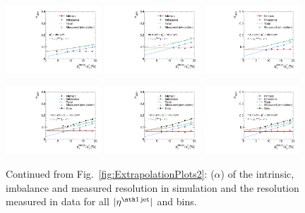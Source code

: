\begin{figure}[!h]
    \includegraphics[width=0.32\textwidth]{figures/resolution/results/JER_for_3_eta_bin_12_pTGamma_bin_all_contributions_PFCHS_RMS99_mc.pdf}
    \includegraphics[width=0.32\textwidth]{figures/resolution/results/JER_for_4_eta_bin_4_pTGamma_bin_all_contributions_PFCHS_RMS99_mc.pdf}
    \includegraphics[width=0.32\textwidth]{figures/resolution/results/JER_for_4_eta_bin_5_pTGamma_bin_all_contributions_PFCHS_RMS99_mc.pdf}

    \includegraphics[width=0.32\textwidth]{figures/resolution/results/JER_for_4_eta_bin_6_pTGamma_bin_all_contributions_PFCHS_RMS99_mc.pdf}
    \includegraphics[width=0.32\textwidth]{figures/resolution/results/JER_for_4_eta_bin_7_pTGamma_bin_all_contributions_PFCHS_RMS99_mc.pdf}
    \includegraphics[width=0.32\textwidth]{figures/resolution/results/JER_for_4_eta_bin_8_pTGamma_bin_all_contributions_PFCHS_RMS99_mc.pdf}
  \caption{Continued from Fig.~\ref{fig:ExtrapolationPlots2}: \jer($\alpha$) of the intrinsic, imbalance and measured resolution in simulation and the resolution measured in data for all $|\etafirstjet|$ and \ptgamma bins.}
  \label{fig:ExtrapolationPlots3}
\end{figure}

